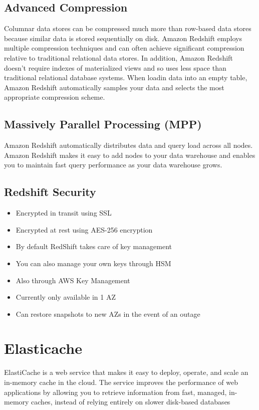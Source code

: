 \documentclass{article}
\begin{document}
\subsection{Advanced Compression}
Columnar data stores can be compressed much more than row-based data stores because similar data is stored sequentially on disk. Amazon Redshift employs multiple compression techniques and can often achieve significant compression relative to traditional relational data stores. In addition, Amazon Redshift doesn't require indexes of materialized views and so uses less space than traditional relational database systems. When loadin data into an empty table, Amazon Redshift automatically samples your data and selects the most appropriate compression scheme.

\subsection{Massively Parallel Processing (MPP)}
Amazon Redshift automatically distributes data and query load across all nodes. Amazon Redshift makes it easy to add nodes to your data warehouse and enables you to maintain fast query performance as your data warehouse grows.

\subsection{Redshift Security}
\begin{itemize}
\item
Encrypted in transit using SSL

\item
Encrypted at rest using AES-256 encryption

\item
By default RedShift takes care of key management

\item
You can also manage your own keys through HSM

\item
Also through AWS Key Management

\item
Currently only available in 1 AZ

\item
Can restore snapshots to new AZs in the event of an outage

\end{itemize}

\section{Elasticache}
ElastiCache is a web service that makes it easy to deploy, operate, and scale an in-memory cache in the cloud. The service improves the performance of web applications by allowing you to retrieve information from fast, managed, in-memory caches, instead of relying entirely on slower disk-based databases
\end{document}
